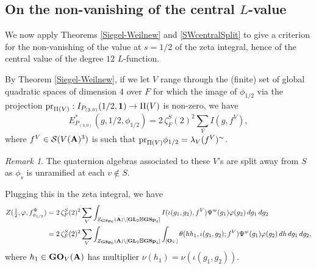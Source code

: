 \documentclass[11pt, reqno]{amsart}
\theoremstyle{plain}
\theoremstyle{definition}
\theoremstyle{remark}
\newtheorem{remark}[theorem]{Remark}
\theoremstyle{plain}
\def\A{{\bf A}}
\def\GSp{{\mathbf{GSp}}}
\def\GL{\mathbf{GL}}
\begin{document}
\subsection{On the non-vanishing of the central $L$-value}\label{subsec_non_vanishing_central_L_value_degree_12}

We now apply Theorems \ref{Siegel-Weilnew} and \ref{SWcentralSplit} to give a criterion for the non-vanishing of the value at $s=1/2$ of the zeta integral, hence of the central value of the degree $12$ $L$-function. 


 By Theorem \ref{Siegel-Weilnew}, if we let $V$ range through the (finite) set of global quadratic spaces of dimension $4$ over $F$ for which the image of $\phi_{1/2}$ via the projection ${\rm pr}_{\Pi(V)}: I_{P_{(3,0)}}(1/2, \mathbf{1}) \to  \Pi(V)$ is non-zero, we have
\[E_{P_{(3,0)}}^*(g, 1/2,\phi_{1/2}) = 2 \,\zeta^S_F(2)^2  \sum_V I(g, f^V),\]
where $f^V \in \mathcal{S}(V(\A)^3)$ is such that ${\rm pr}_{\Pi(V)} \phi_{1/2}  = \lambda_V(f^V)^{\sim}$.

\begin{remark}\label{RemarkonHowManyVAppear}
The quaternion algebras associated to these $V$'s are split away from $S$ as $\phi_s$ is unramified at each $v \not \in S$.     
\end{remark}
\noindent Plugging this in the zeta integral, we have 
\begin{align*}
    Z(\tfrac{1}{2},\varphi,f^\Psi_{\phi_{1/2}}) &= 2 \,\zeta^S_F(2)^2  \sum_V \int_{Z_{\GSp_6}(\A)\backslash [\GL_2\boxtimes \GSp_4]} I(\iota( g_1  , g_2), f^V) \Psi^w( g_1 ) \varphi(g_2)\, dg_1\,dg_2 \\ &= 2 \,\zeta^S_F(2)^2  \sum_V \int_{Z_{\GSp_6}(\A)\backslash [\GL_2\boxtimes \GSp_4]} \int_{[\mathbf{O}_V]} \theta(h h_1, \iota( g_1  , g_2) ; f^V) \Psi^w( g_1 ) \varphi(g_2) \, d h \, dg_1\,dg_2,
\end{align*}
where $h_1 \in \mathbf{GO}_V(\A)$ has multiplier $\nu(h_1) = \nu (\iota( g_1  , g_2))$. 
\end{document}
